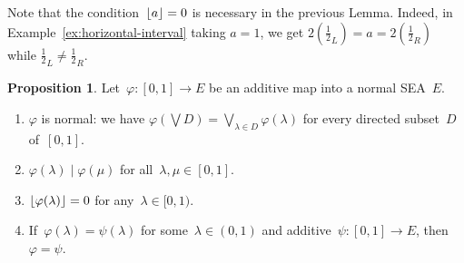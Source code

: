\documentclass[a4paper, onecolumn, accepted=2020-12-22]{quantumarticle}
\DeclarePairedDelimiter{\floor}{\lfloor}{\rfloor}
\newcommand{\mult}{\mathop{\circ}}
\newcommand{\commu}{\mathrel{\lvert}}
\newcounter{counter}
\theoremstyle{definition}
\newtheorem{proposition}[counter]{Proposition}
\begin{document}
Note that the condition~$\floor{a} = 0$
    is necessary in the previous Lemma. Indeed, in
    Example~\ref{ex:horizontal-interval} taking $a=1$, we get $2(\frac12_L) = a
    = 2(\frac12_R)$ while $\frac12_L\neq \frac12_R$.
\begin{proposition}
\label{prop:add-into-nsea}
Let~$\varphi\colon [0,1]\to E$
be an additive map into a normal SEA~$E$.
\begin{enumerate}
\item
\label{prop:add-into-nsea-1}
$\varphi$ is normal:
we have $\varphi(\bigvee D)=\bigvee_{\lambda\in D} \varphi(\lambda)$
for every directed subset~$D$ of~$[0,1]$.
\item
\label{prop:add-into-nsea-2}
$\varphi(\lambda)\commu \varphi(\mu)$
        for all~$\lambda,\mu\in [0,1]$.
\item
\label{prop:add-into-nsea-5}
    $\floor{\varphi(\lambda)} = 0 $ for any~$\lambda \in [0,1)$.
\item
\label{prop:add-into-nsea-4}
If~$\varphi(\lambda) = \psi(\lambda)$
    for some~$\lambda \in (0,1)$
        and additive~$\psi\colon [0,1] \to E$,
        then~$\varphi = \psi$.
\end{enumerate}
\end{proposition}
\end{document}
